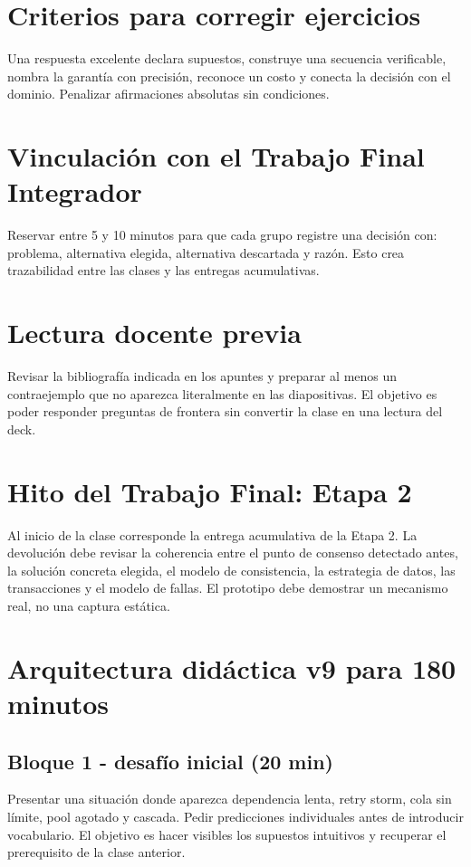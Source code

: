 \documentclass[variant=docente,cover=institutional,mode=screen]{ua-engineering-v6-article}
\begin{document}
\section{Criterios para corregir ejercicios}
Una respuesta excelente declara supuestos, construye una secuencia verificable, nombra la garantía con precisión, reconoce un costo y conecta la decisión con el dominio. Penalizar afirmaciones absolutas sin condiciones.
\section{Vinculación con el Trabajo Final Integrador}
Reservar entre 5 y 10 minutos para que cada grupo registre una decisión con: problema, alternativa elegida, alternativa descartada y razón. Esto crea trazabilidad entre las clases y las entregas acumulativas.
\section{Lectura docente previa}
Revisar la bibliografía indicada en los apuntes y preparar al menos un contraejemplo que no aparezca literalmente en las diapositivas. El objetivo es poder responder preguntas de frontera sin convertir la clase en una lectura del deck.

\section{Hito del Trabajo Final: Etapa 2}
Al inicio de la clase corresponde la entrega acumulativa de la Etapa 2. La devolución debe revisar la coherencia entre el punto de consenso detectado antes, la solución concreta elegida, el modelo de consistencia, la estrategia de datos, las transacciones y el modelo de fallas. El prototipo debe demostrar un mecanismo real, no una captura estática.

\section{Arquitectura didáctica v9 para 180 minutos}
\subsection*{Bloque 1 - desafío inicial (20 min)}
Presentar una situación donde aparezca dependencia lenta, retry storm, cola sin límite, pool agotado y cascada. Pedir predicciones individuales antes de introducir vocabulario. El objetivo es hacer visibles los supuestos intuitivos y recuperar el prerequisito de la clase anterior.
\end{document}
